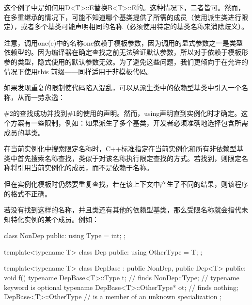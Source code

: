 这个例子中是如何用D<T>::E替换B<T>::E的。这种情况下，二者皆可。然而，在多重继承的情况下，可能不知道哪个基类提供了所需的成员（使用派生类进行限定），或者多个基类可能声明相同的名称（必须使用特定的基类名称来消除歧义）。

注意，调用one(e)中的名称one依赖于模板参数，因为调用的显式参数之一是类型依赖型的。因为编译器在确定查找之前无法验证默认参数，所以对于依赖于模板形参的类型，隐式使用的默认参数无效。为了避免这些问题，我们更倾向于在允许的情况下使用this\inlcpp{->} 前缀——同样适用于非模板代码。

如果发现重复的限制使代码陷入混乱，可以从派生类中的依赖型基类中引入一个名称，从而一劳永逸：


\#2的查找成功并找到\#1的使用的声明。然而，using声明直到实例化时才确定。这个方案有一些限制，例如：如果派生了多个基类，开发者必须准确地选择包含所需成员的基类。

在当前实例化中搜索限定名称时，C++标准指定在当前实例化和所有非依赖型基类中首先搜索名称查找，类似于对该名称执行限定查找的方式。若找到，则限定名称将引用当前实例化的成员，而不是依赖于名称。

\begin{notice}
但在实例化模板时仍然要重复查找，若在该上下文中产生了不同的结果，则该程序的格式不正确。
\end{notice}

若没有找到这样的名称，并且类还有其他的依赖型基类，那么受限名称就会指代未知特化实例的某个成员。例如：

\begin{cpp}
class NonDep {
	public:
	using Type = int;
};

template<typename T>
class Dep {
	public:
	using OtherType = T;
};

template<typename T>
class DepBase : public NonDep, public Dep<T> {
	public:
	void f() {
		typename DepBase<T>::Type t; // finds NonDep::Type;
		// typename keyword is optional
		typename DepBase<T>::OtherType* ot; // finds nothing; DepBase<T>::OtherType
		// is a member of an unknown specialization
	}
};
\end{cpp}























